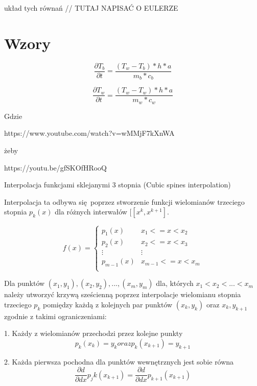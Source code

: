 \documentclass[varwidth,12pt,a4paper]{article}
\begin{document}
układ tych równań // TUTAJ NAPISAĆ O EULERZE



\section{Wzory}

\begin{equation}
    \frac{\partial T_b}{\partial t}=\frac{(T_w-T_b)*h*a}{m_b*c_b}
\end{equation}

\begin{equation}
    \frac{\partial T_w}{\partial t}=\frac{(T_w-T_w)*h*a}{m_w*c_w}
\end{equation}

Gdzie 

https://www.youtube.com/watch?v=wMMjF7kXnWA

żeby 

https://youtu.be/gfSKOfHRooQ

Interpolacja funkcjami sklejanymi 3 stopnia (Cubic spines interpolation)

Interpolacja ta odbywa się poprzez stworzenie funkcji wielomianów trzeciego stopnia $ p_k(x) $
dla różnych interwałów $ [[x^k, x^{k+1}] $.

$$
    f(x) = \left\{ \begin{array}{ll}
    p_1 (x) & \textrm{$x_1 <= x < x_2$}\\
    p_2 (x) & \textrm{$x_2 <= x < x_3$}\\
    \vdots  & \vdots \\
    p_{m-1} (x) & \textrm{$x_{m-1} <= x < x_m$}\\
    \end{array} \right.
$$

Dla punktów $(x_1, y_1), (x_2, y_2), ..., (x_m, y_m)$ dla, których $x_1 < x_2 < ... < x_m $
należy utworzyć krzywą sześcienną poprzez interpolacje wielomianu stopnia trzeciego $p_k$ 
pomiędzy każdą z kolejnych par punktów $(x_k, y_k)$ oraz $x_{k}, y_{k+1}$ zgodnie z takimi ograniczeniami:

1. Każdy z wielomianów przechodzi przez kolejne punkty
\begin{equation}
    p_k (x_k) = y_k oraz p_k (x_{k+1}) = y_{k + 1}
\end{equation}

2. Każda pierwsza pochodna dla punktów wewnętrznych jest sobie równa
\begin{equation}
     \frac{\partial d}{\partial dx} p_jk (x_{k+1}) = \frac{\partial d}{\partial dx} p_{k+1} (x_{k+1})
\end{equation}
\end{document}
